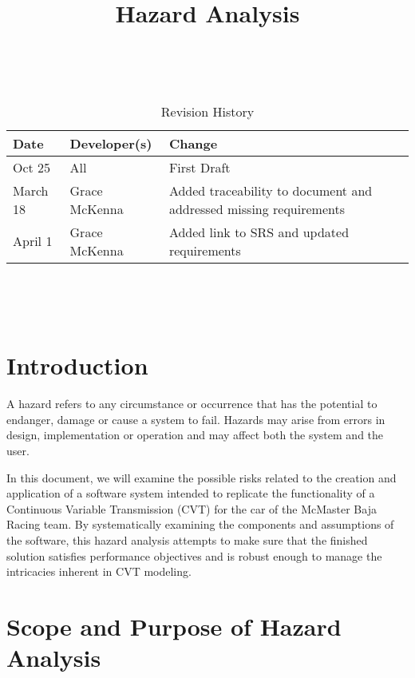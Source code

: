 \documentclass{article}
\title{Hazard Analysis\\\progname}
\author{\authname}
\date{}
\begin{document}
\maketitle
\thispagestyle{empty}

~\newpage


\begin{table}[hp]
\caption{Revision History} \label{TblRevisionHistory}
\begin{tabularx}{\textwidth}{llX}
\toprule
\textbf{Date} & \textbf{Developer(s)} & \textbf{Change}\\
\midrule
Oct 25 & All & First Draft\\
March 18 & Grace McKenna & Added traceability to document and addressed missing requirements \\
April 1 & Grace McKenna & Added link to SRS and updated requirements\\
\bottomrule
\end{tabularx}
\end{table}

~\newpage

\tableofcontents

~\newpage


\section{Introduction}

A hazard refers to any circumstance or occurrence that has the potential to endanger, damage or cause a system to fail. Hazards may arise from errors in design, implementation or operation and may affect both the system and the user.

\noindent In this document, we will examine the possible risks related to the creation and application of a software system intended to replicate the functionality of a Continuous Variable Transmission (CVT) for the car of the McMaster Baja Racing team. By systematically examining the components and assumptions of the software, this hazard analysis attempts to make sure that the finished solution satisfies performance objectives and is robust enough to manage the intricacies inherent in CVT modeling.

\section{Scope and Purpose of Hazard Analysis}
\end{document}
